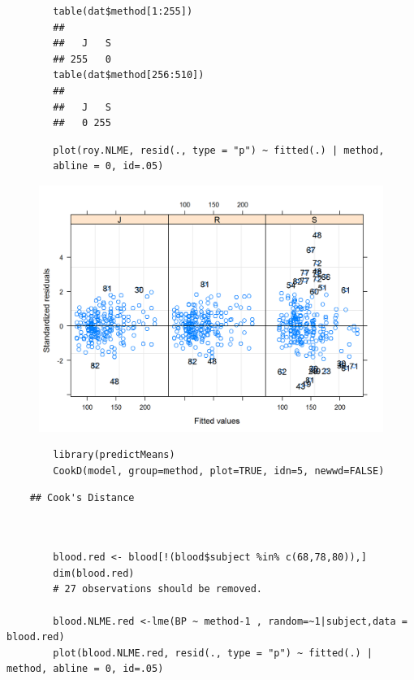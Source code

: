 \documentclass[12pt, a4paper]{report}
\theoremstyle{plain}
\theoremstyle{definition}
\theoremstyle{remark}
\begin{document}
	\begin{framed}
		\begin{verbatim}
		table(dat$method[1:255])
		## 
		##   J   S 
		## 255   0
		table(dat$method[256:510])
		## 
		##   J   S 
		##   0 255
		\end{verbatim}	
	\end{framed}
	\newpage
	\begin{framed}
		\begin{verbatim}
		plot(roy.NLME, resid(., type = "p") ~ fitted(.) | method, 
		abline = 0, id=.05)
		\end{verbatim}
	\end{framed}
	\begin{figure}
		\centering
		\includegraphics[width=0.9\linewidth]{images/bloodnlmeResidPlot2}
		\caption{}
		\label{fig:blood}
	\end{figure}
	
	\begin{framed}
		\begin{verbatim}
		library(predictMeans)
		CookD(model, group=method, plot=TRUE, idn=5, newwd=FALSE)
		\end{verbatim}
	\end{framed}
	
	
	\begin{verbatim}
	## Cook's Distance
	
	\end{verbatim}
	
	
	
	\begin{framed}
		\begin{verbatim}
		
		blood.red <- blood[!(blood$subject %in% c(68,78,80)),]
		dim(blood.red)
		# 27 observations should be removed.
		
		blood.NLME.red <-lme(BP ~ method-1 , random=~1|subject,data = blood.red)
		plot(blood.NLME.red, resid(., type = "p") ~ fitted(.) | method, abline = 0, id=.05)
		\end{verbatim}
	\end{framed}
	
\end{document}
